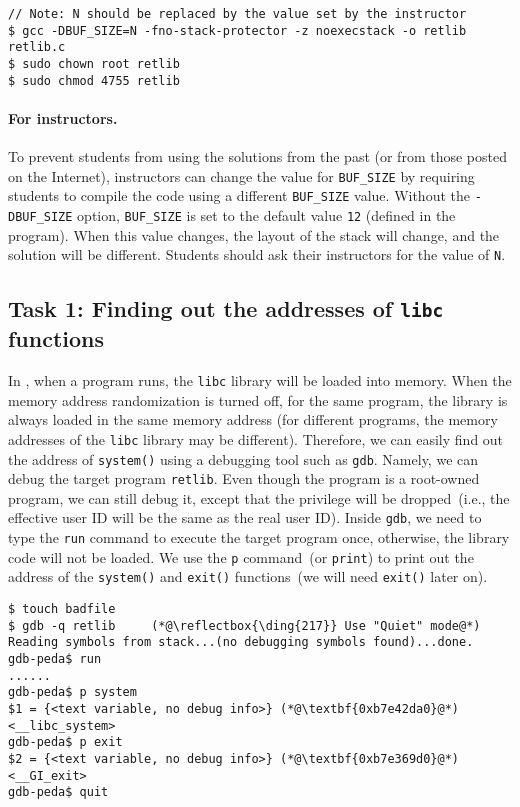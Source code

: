 \begin{lstlisting}
// Note: N should be replaced by the value set by the instructor
$ gcc -DBUF_SIZE=N -fno-stack-protector -z noexecstack -o retlib retlib.c
$ sudo chown root retlib           
$ sudo chmod 4755 retlib           
\end{lstlisting}


\paragraph{For instructors.}
To prevent students from using the solutions from the past (or from those
posted on the Internet), instructors can change the
value for \texttt{BUF\_SIZE} by requiring students to compile the
code using a different \texttt{BUF\_SIZE} value.
Without the \texttt{-DBUF\_SIZE}
option, \texttt{BUF\_SIZE} is set to the default value \texttt{12} (defined
in the program).
When this value changes, the layout of the stack
will change, and the solution will be different.
Students should ask their instructors for
the value of \texttt{N}.



\subsection{Task 1: Finding out the addresses of \texttt{libc} functions} 

In \linux, when a program runs, the \texttt{libc} library will be loaded
into memory. When the memory address randomization is turned off,
for the same program, the library is always loaded in the same memory
address (for different programs, the memory addresses
of the \texttt{libc} library may be different).
Therefore, we can easily find out the address of \texttt{system()}
using a debugging tool such as \texttt{gdb}. Namely, we can debug
the target program \texttt{retlib}. Even though the program is a root-owned \setuid program,
we can still debug it, except that the privilege will be dropped~(i.e., the effective user ID
will be the same as the real user ID).
Inside \texttt{gdb}, we need to type the \texttt{run} command to execute the target program once,
otherwise, the library code will not be loaded.
We use the \texttt{p} command~(or \texttt{print}) to print out the address of
the \texttt{system()} and \texttt{exit()} functions~(we will need \texttt{exit()} later on).

\begin{lstlisting}
$ touch badfile
$ gdb -q retlib     (*@\reflectbox{\ding{217}} Use "Quiet" mode@*)
Reading symbols from stack...(no debugging symbols found)...done.
gdb-peda$ run
......
gdb-peda$ p system
$1 = {<text variable, no debug info>} (*@\textbf{0xb7e42da0}@*) <__libc_system>
gdb-peda$ p exit
$2 = {<text variable, no debug info>} (*@\textbf{0xb7e369d0}@*) <__GI_exit>
gdb-peda$ quit
\end{lstlisting}

